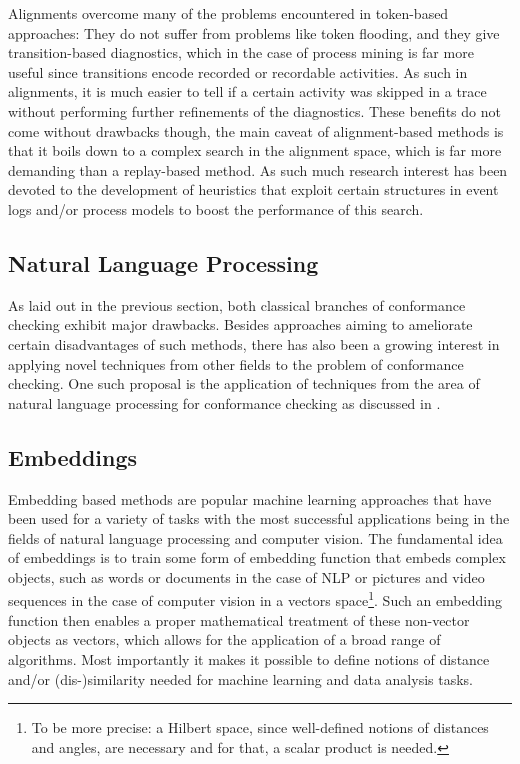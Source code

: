 \documentclass[runningheads]{template/llncs}
\begin{document}
Alignments overcome many of the problems encountered in token-based approaches: 
They do not suffer from problems like token flooding, and they give transition-based diagnostics, which in the case of process mining is far more useful since transitions encode recorded or recordable activities. 
As such in alignments, it is much easier to tell if a certain activity was skipped in a trace without performing further refinements of the diagnostics.
These benefits do not come without drawbacks though, the main caveat of alignment-based methods is that it boils down to a complex search in the alignment space, which is far more demanding than a replay-based method.
As such much research interest has been devoted to the development of heuristics that exploit certain  structures in event logs and/or process models to boost the performance of this search.

\subsection{Natural Language Processing}
\label{sub:nlp}
As laid out in the previous section, both classical branches of conformance checking exhibit major drawbacks.
Besides approaches aiming to ameliorate certain disadvantages of such methods, there has also been a growing interest in applying novel techniques from other fields to the problem of conformance checking.
One such proposal is the application of techniques from the area of natural language processing for conformance checking as discussed in \cite{PBWe20}.

\subsection{Embeddings}
Embedding based methods are popular machine learning approaches that have been used for a variety of tasks with the most successful applications being in the fields of natural language processing and computer vision.
The fundamental idea of embeddings is to train some form of embedding function that embeds complex objects, such as words or documents in the case of NLP or pictures and video sequences in the case of computer vision in a vectors space\footnote{To be more precise: a Hilbert space, since well-defined notions of distances and angles, are necessary and for that, a scalar product  is needed.}.
Such an embedding function then enables a proper mathematical treatment of these non-vector objects as vectors, which allows for the application of a broad range of algorithms.
Most importantly it makes it possible to define notions of distance and/or (dis-)similarity needed for machine learning and data analysis tasks.
\end{document}
